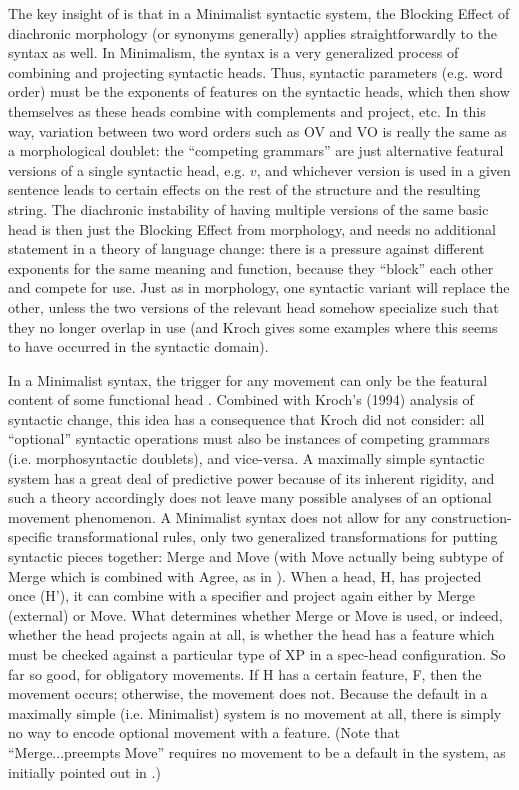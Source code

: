 The key insight of \citet{kroch1994} is that in a Minimalist syntactic system, the Blocking Effect of diachronic morphology (or synonyms generally) applies straightforwardly to the syntax as well. In Minimalism, the syntax is a very generalized process of combining and projecting syntactic heads. Thus, syntactic parameters (e.g. word order) must be the exponents of features on the syntactic heads, which then show themselves as these heads combine with complements and project, etc. In this way, variation between two word orders such as OV and VO is really the same as a morphological doublet: the ``competing grammars'' \citep{kroch1989} are just alternative featural versions of a single syntactic head, e.g. $v$, and whichever version is used in a given sentence leads to certain effects on the rest of the structure and the resulting string. The diachronic instability of having multiple versions of the same basic head is then just the Blocking Effect from morphology, and needs no additional statement in a theory of language change: there is a pressure against different exponents for the same meaning and function, because they ``block'' each other and compete for use. Just as in morphology, one syntactic variant will replace the other, unless the two versions of the relevant head somehow specialize such that they no longer overlap in use (and Kroch gives some examples where this seems to have occurred in the syntactic domain).

In a Minimalist syntax, the trigger for any movement can only be the featural content of some functional head \citep{chomsky2000, chomsky2001}. Combined with Kroch's (1994) analysis of syntactic change, this idea has a consequence that Kroch did not consider: all ``optional'' syntactic operations must also be instances of competing grammars (i.e. morphosyntactic doublets), and vice-versa. A maximally simple syntactic system has a great deal of predictive power because of its inherent rigidity, and such a theory accordingly does not leave many possible analyses of an optional movement phenomenon. A Minimalist syntax does not allow for any construction-specific transformational rules, only two generalized transformations for putting syntactic pieces together: Merge and Move (with Move actually being subtype of Merge which is combined with Agree, as in \citealt{chomsky2000}). When a head, H, has projected once (H'), it can combine with a specifier and project again either by Merge (external) or Move. What determines whether Merge or Move is used, or indeed, whether the head projects again at all, is whether the head has a feature which must be checked against a particular type of XP in a spec-head configuration. So far so good, for obligatory movements. If H has a certain feature, F, then the movement occurs; otherwise, the movement does not. Because the default in a maximally simple (i.e. Minimalist) system is no movement at all, there is simply no way to encode optional movement with a feature. (Note that ``Merge...preempts Move'' requires no movement to be a default in the system, as initially pointed out in \citealt{chomsky2000}.)

